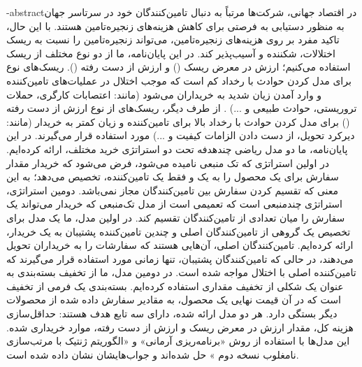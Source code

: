 \fa-abstract{در اقتصاد جهانی، شرکت‌ها مرتباً به دنبال تامین‌کنندگان خود در سرتاسر جهان به منظور دستیابی به فرصتی برای کاهش هزینه‌های زنجیره‌تامین هستند. با این حال، تاکید مفرد بر روی هزینه‌های زنجیره‌تامین، می‌تواند زنجیره‌تامین را نسبت به ریسک اختلالات، شکننده و آسیب‌پذیر کند. در این پایان‌نامه، ما از دو نوع مختلف از ریسک استفاده می‌کنیم؛ ارزش در معرض ریسک ()  و ارزش از دست رفته ().
ریسک‌های نوع 
برای مدل کردن حوادث با رخداد کم است که موجب اختلال در عملیات‌های تامین‌کننده و وارد آمدن زیان شدید به خریداران می‌شود (مانند: اعتصابات کارگری، حملات تروریستی، حوادث طبیعی و ...)
. از طرف دیگر، ریسک‌های از نوع ارزش از دست رفته 
()
برای مدل کردن حوادث با رخداد بالا برای تامین‌کننده و زیان کمتر به خریدار (مانند: دیرکرد تحویل، از دست دادن الزامات کیفیت و ...)
مورد استفاده قرار می‌گیرند. 
در این پایان‌نامه، ما دو مدل ریاضی چندهدفه تحت دو استراتژی خرید مختلف، ارائه کرده‌ایم. در اولین استراتژی که تک منبعی نامیده می‌شود، فرض می‌شود که خریدار مقدار سفارش برای یک محصول را به یک و فقط یک تامین‌کننده، تخصیص می‌دهد؛ به این معنی که تقسیم کردن سفارش بین تامین‌کنندگان مجاز نمی‌باشد. دومین استراتژی، استراتژی چندمنبعی است که تعمیمی است از مدل تک‌منبعی که خریدار می‌تواند یک سفارش را میان تعدادی از تامین‌کنندگان تقسیم کند. در اولین مدل، ما یک مدل برای تخصیص یک گروهی از تامین‌کنندگان اصلی و چندین تامین‌کننده پشتیبان به یک خریدار، ارائه کرده‌ایم. تامین‌کنندگان اصلی، آن‌هایی هستند که سفارشات را به خریداران تحویل می‌دهند، در حالی که تامین‌کنندگان پشتیبان، تنها زمانی مورد استفاده قرار می‌گیرند که تامین‌کننده اصلی با اختلال مواجه شده است. در دومین مدل، ما از تخفیف بسته‌بندی به عنوان یک شکلی از تخفیف مقداری استفاده کرده‌ایم. بسته‌بندی یک فرمی از تخفیف است که در آن قیمت نهایی یک محصول، به مقادیر سفارش داده شده از محصولات دیگر بستگی دارد. هر دو مدل ارائه شده، دارای سه تابع هدف هستند: حداقل‌سازی هزینه‌ کل، مقدار ارزش در معرض ریسک و ارزش از دست رفته، موارد خریداری شده. این مدل‌ها با استفاده از روش «برنامه‌ریزی آرمانی» و «الگوریتم ژنتیک با مرتب‌سازی نامغلوب نسخه دوم 
» حل شده‌اند و جواب‌هایشان نشان داده شده است.
}



\abstractPage

\newpage\clearpage